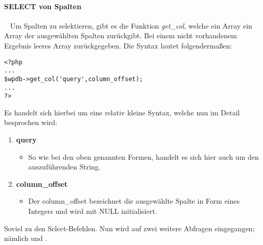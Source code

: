 \paragraph{SELECT von Spalten}\ \newline
Um Spalten zu selektieren, gibt es die Funktion \emph{get\_col}, welche ein Array ein Array der ausgewählten Spalten zurückgibt. Bei einem nicht vorhandenem Ergebnis leeres Array zurückgegeben. Die Syntax lautet folgendermaßen:
\begin{lstlisting}
<?php 
...
$wpdb->get_col('query',column_offset); 
...
?> 
\end{lstlisting}
Es handelt sich hierbei um eine relativ kleine Syntax, welche nun im Detail besprochen wird:
\begin{enumerate}
	\item {\bf query}
	\begin{itemize}
		\item So wie bei den oben genannten Formen, handelt es sich hier auch um den auszuführenden String.
	\end{itemize}
	\item {\bf column\_offset}
	\begin{itemize}
		\item Der column\_offset bezeichnet die ausgewählte Spalte in Form eines Integers und wird mit NULL initialisiert.
	\end{itemize}
\end{enumerate}
Soviel zu den Select-Befehlen. Nun wird auf zwei weitere Abfragen eingegangen; nämlich  und .
